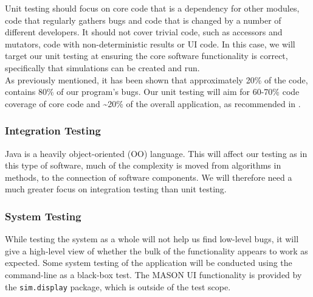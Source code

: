 \documentclass[11pt]{article}
\begin{document}
Unit testing should focus on core code that is a dependency for other modules, code that regularly gathers bugs and code that is changed by a number of different developers.
It should not cover trivial code, such as accessors and mutators, code with non-deterministic results or UI code.\cite{dont_test_blindly}
In this case, we will target our unit testing at ensuring the core software functionality is correct, specifically that simulations can be created and run.
\\

As previously mentioned, it has been shown that approximately 20\% of the code, contains 80\% of our program's bugs.
Our unit testing will aim for 60-70\% code coverage of core code and \textasciitilde 20\% of the overall application, as recommended in \cite{dont_test_blindly}.

\subsubsection{Integration Testing}

Java is a heavily object-oriented (OO) language. This will affect our testing as in this type of software, much of the complexity is moved from algorithms in methods, to the connection of software components\cite[pp.236]{introduction_book}. We will therefore need a much greater focus on integration testing than unit testing.




\subsubsection{System Testing}
While testing the system as a whole will not help us find low-level bugs, it will give a high-level view of whether the bulk of the functionality appears to work as expected.
Some system testing of the application will be conducted using the command-line as a black-box test.
The MASON UI functionality is provided by the \texttt{sim.display} package, which is outside of the test scope.
\\
\end{document}
